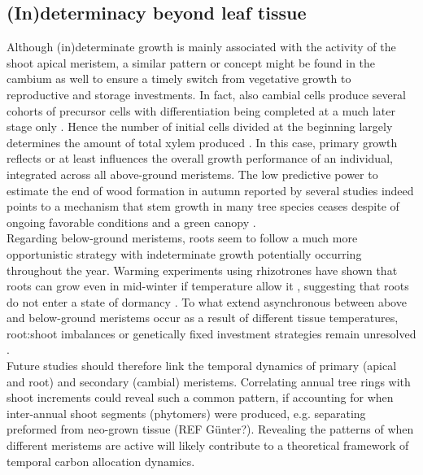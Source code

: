\documentclass{article}
\begin{document}
\subsection*{(In)determinacy beyond leaf tissue} 
Although (in)determinate growth is mainly associated with the activity of the shoot apical meristem, a similar pattern or concept might be found in the cambium as well to ensure a timely switch from vegetative growth to reproductive and storage investments. In fact, also cambial cells produce several cohorts of precursor cells with differentiation being completed at a much later stage only \citep{valdovinos-ayalaSeasonalPatternsIncreases2022}. Hence the number of initial cells divided at the beginning largely determines the amount of total xylem produced \citep{lupiXylemPhenologyWood2010}. In this case, primary growth reflects or at least influences the overall growth performance of an individual, integrated across all above-ground meristems. The low predictive power to estimate the end of wood formation in autumn reported by several studies \citep{buttoComparingCellDynamics2020} indeed points to a mechanism that stem growth in many tree species ceases despite of ongoing favorable conditions and a green canopy \citep{arendStemGrowthPhenology2024}.\\

Regarding below-ground meristems, roots seem to follow a much more opportunistic strategy with indeterminate growth potentially occurring throughout the year. Warming experiments using rhizotrones have shown that roots can grow even in mid-winter if temperature allow it \citep{lyfordControlledGrowthForest1966}, suggesting that roots do not enter a state of dormancy \citep{radvilleRootPhenologyChanging2016}. To what extend asynchronous between above and below-ground meristems occur as a result of different tissue temperatures, root:shoot imbalances or genetically fixed investment strategies remain unresolved \citep{abramoffAreBelowgroundPhenology2015, makotoSynchronousAsynchronousRoot2020}.\\

 Future studies should therefore link the temporal dynamics of primary (apical and root) and secondary (cambial) meristems. Correlating annual tree rings with shoot increments could reveal such a common pattern, if accounting for when inter-annual shoot segments (phytomers) were produced, e.g. separating preformed from neo-grown tissue (REF Günter?). Revealing the patterns of when different meristems are active will likely contribute to a theoretical framework of temporal carbon allocation dynamics.
\end{document}
